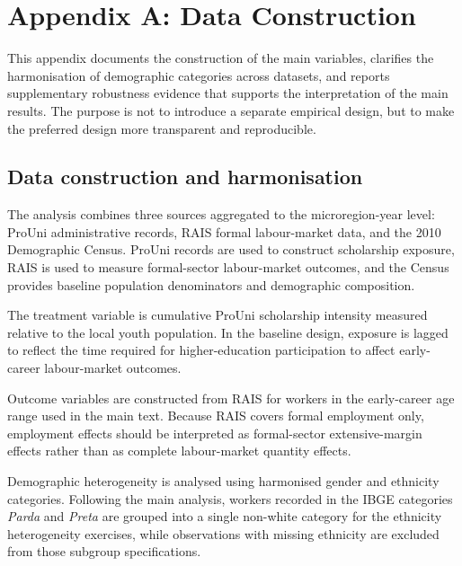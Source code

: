 
\clearpage
\section{Appendix A: Data Construction }
\label{app:A}

This appendix documents the construction of the main variables, clarifies the harmonisation of demographic categories across datasets, and reports supplementary robustness evidence that supports the interpretation of the main results. The purpose is not to introduce a separate empirical design, but to make the preferred design more transparent and reproducible.

\subsection{Data construction and harmonisation}
\label{app:data_construction}

The analysis combines three sources aggregated to the microregion-year level: ProUni administrative records, RAIS formal labour-market data, and the 2010 Demographic Census. ProUni records are used to construct scholarship exposure, RAIS is used to measure formal-sector labour-market outcomes, and the Census provides baseline population denominators and demographic composition.

The treatment variable is cumulative ProUni scholarship intensity measured relative to the local youth population. In the baseline design, exposure is lagged to reflect the time required for higher-education participation to affect early-career labour-market outcomes.

Outcome variables are constructed from RAIS for workers in the early-career age range used in the main text. Because RAIS covers formal employment only, employment effects should be interpreted as formal-sector extensive-margin effects rather than as complete labour-market quantity effects.

Demographic heterogeneity is analysed using harmonised gender and ethnicity categories. Following the main analysis, workers recorded in the IBGE categories \textit{Parda} and \textit{Preta} are grouped into a single non-white category for the ethnicity heterogeneity exercises, while observations with missing ethnicity are excluded from those subgroup specifications.

